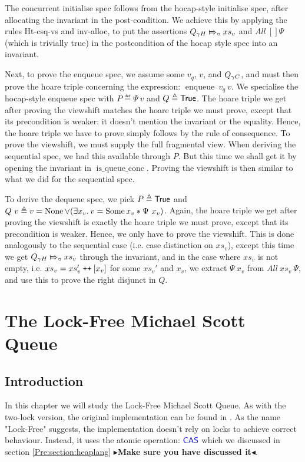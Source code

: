\documentclass[twoside,11pt,openright]{report}
\newcommand{\enqueue}{\operatorname{enqueue}}
\newcommand{\isqueueconc}{\operatorname{is\_queue\_conc}}
\newcommand\catenate{\mathbin{\text{\ttfamily\upshape ++}}}
\newcommand{\abstractstatefullfrag}[2]{#1 \Mapsto_{\circ} #2}
\newcommand{\todo}[1]{{\color[rgb]{.5,0,0}\textbf{$\blacktriangleright$#1$\blacktriangleleft$}}}
\begin{document}
The concurrent initialise spec follows from the hocap-style initialise spec, after allocating the invariant in the post-condition. We achieve this by applying the rules Ht-csq-vs and inv-alloc, to put the assertions $\abstractstatefullfrag{Q_{\gname H}}{xs_v}$ and $All\ [] \Psi$ (which is trivially true) in the postcondition of the hocap style spec into an invariant.

Next, to prove the enqueue spec, we assume some $v_q$, $v$, and $Q_{\gamma C}$, and must then prove the hoare triple concerning the expression: $\enqueue\ v_q\ v$. We specialise the hocap-style enqueue spec with $P \eqdef \Psi \ v$ and $Q \triangleq \textsf{True}$. The hoare triple we get after proving the viewshift matches the hoare triple we must prove, except that its precondition is weaker: it doesn't mention the invariant or the equality. Hence, the hoare triple we have to prove simply follows by the rule of consequence.
To prove the viewshift, we must supply the full fragmental view. When deriving the sequential spec, we had this available through $P$. But this time we shall get it by opening the invariant in $\isqueueconc$. Proving the viewshift is then similar to what we did for the sequential spec.

To derive the dequeue spec, we pick $P \triangleq \textsf{True}$ and $Q \ v \eqdef v = \None \lor (\Exists x_v . v = \Some{x_v} \star \Psi \ x_v)$. Again, the hoare triple we get after proving the viewshift is exactly the hoare triple we must prove, except that its precondition is weaker. Hence, we only have to prove the viewshift. This is done analogously to the sequential case (i.e. case distinction on $xs_v$), except this time we get $\abstractstatefullfrag{Q_{\gname H}}{xs_v}$ through the invariant, and in the case where $xs_v$ is not empty, i.e. $xs_v = xs_v' \catenate [x_v]$ for some $xs_v'$ and $x_v$, we extract $\Psi \ x_v$ from $All\ xs_v \ \Psi$, and use this to prove the right disjunct in $Q$.


\chapter{The Lock-Free Michael Scott Queue}
\label{ch:LF}

\section{Introduction}
\label{LFMSQ:section:introduction}

In this chapter we will study the Lock-Free Michael Scott Queue. As with the two-lock version, the original implementation can be found in \cite{DBLP:conf/podc/MichaelS96}. As the name "Lock-Free" suggests, the implementation doesn't rely on locks to achieve correct behaviour. Instead, it uses the atomic operation: $\textsf{\color{blue} CAS}$ which we discussed in section \ref{Pre:section:heaplang} \todo{Make sure you have discussed it}.
\end{document}
